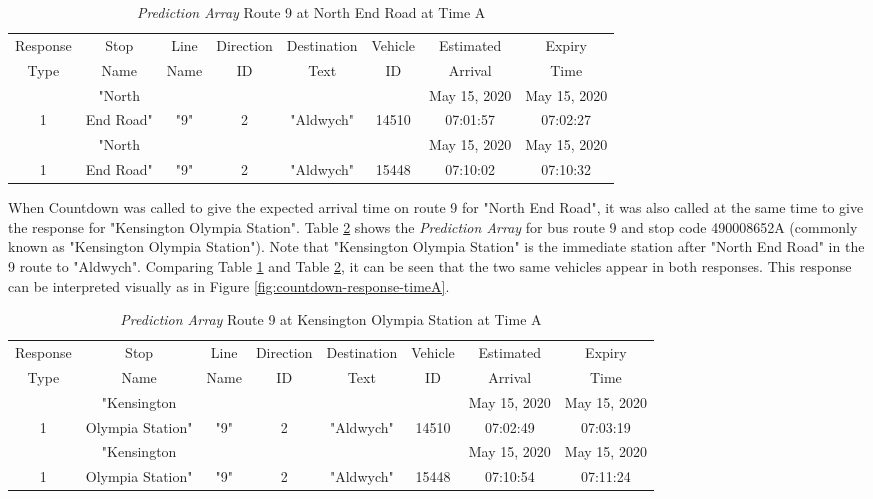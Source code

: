 \begin{table}[H]
    \centering
    \setlength\tabcolsep{2pt}
    \begin{tabular}{|c|c|c|c|c|c|c|c|}
        \hline
          Response & Stop   &   Line & Direction & Destination & Vehicle & Estimated & Expiry \\[-3pt]
           Type & Name &    Name & ID &  Text & ID & Arrival &  Time \\
        \hline
             & "North &  &  &  &  & May 15, 2020  & May 15, 2020 \\[-3pt]
            1 & End Road" & "9" & 2 & "Aldwych" & 14510 & 07:01:57 & 07:02:27 \\
        \hline
             & "North &  &  &  &  & May 15, 2020 & May 15, 2020 \\[-3pt]
            1 & End Road" & "9" & 2 & "Aldwych" & 15448 & 07:10:02 & 07:10:32 \\
        \hline
        \end{tabular}
    \caption{\textit{Prediction Array} Route 9 at North End Road at Time A}
    \label{table:prediction-array-stopa}
\end{table}

When Countdown was called to give the expected arrival time on route 9 for "North End Road", it was also called at the same time to give the response for "Kensington Olympia Station". Table \ref{table:prediction-array-stopb} shows the \textit{Prediction Array} for bus route 9 and stop code 490008652A (commonly known as "Kensington Olympia Station"). Note that "Kensington Olympia Station" is the immediate station after "North End Road" in the 9 route to "Aldwych". Comparing Table \ref{table:prediction-array-stopa} and Table \ref{table:prediction-array-stopb}, it can be seen that the two same vehicles appear in both responses. This response can be interpreted visually as in Figure \ref{fig:countdown-response-timeA}.

\begin{table}[H]
    \centering
    \setlength\tabcolsep{2pt}
    \begin{tabular}{|c|c|c|c|c|c|c|c|}
        \hline
          Response & Stop   &   Line & Direction & Destination & Vehicle & Estimated & Expiry \\[-3pt]
            Type & Name &    Name & ID &  Text & ID & Arrival &  Time \\
        \hline
             & "Kensington &  &  &  &  & May 15, 2020 & May 15, 2020 \\[-3pt]
            1 & Olympia Station" & "9" & 2 & "Aldwych" & 14510 & 07:02:49 & 07:03:19 \\
        \hline
             & "Kensington &  &  &  &  & May 15, 2020 & May 15, 2020 \\[-3pt]
            1 & Olympia Station" & "9" & 2 & "Aldwych" & 15448 & 07:10:54 & 07:11:24 \\
        \hline
        \end{tabular}
    \caption{\textit{Prediction Array} Route 9 at Kensington Olympia Station at Time A}
    \label{table:prediction-array-stopb}
\end{table}

